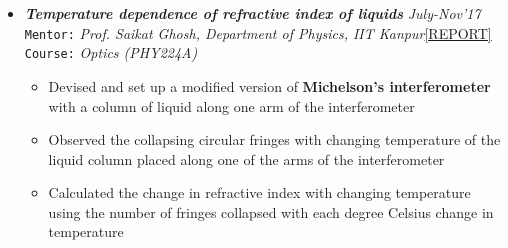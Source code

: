 \documentclass[11pt,a4paper]{article}
\begin{document}
\begin{itemize}
    \item \textbf{\textit{Temperature dependence of refractive index of liquids}} \hfill \textit{July-Nov'17}\\
    \texttt{Mentor:} \textit{Prof. Saikat Ghosh, Department of Physics, IIT Kanpur}\hfill \href{https://github.com/smitchaudhary/CV/blob/main/Assets/PHY224_Project_Report.pdf}{\textsc{[REPORT]}}\\
    \texttt{Course:} \textit{Optics (PHY224A)}
    \begin{itemize}
        \item Devised and set up a modified version of \textbf{Michelson's interferometer} with a column of liquid along one arm of the interferometer
        \item Observed the collapsing circular fringes with changing temperature of the liquid column placed along one of the arms of the interferometer
        \item Calculated the change in refractive index with changing temperature using the number of fringes collapsed with each degree Celsius change in temperature
    \end{itemize}

\end{itemize}
\end{document}
